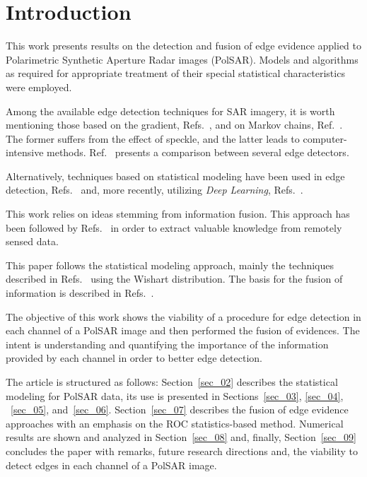 \documentclass[conference]{IEEEtran}
\begin{document}
\section{Introduction}\label{sec_01}

This work presents results on the detection and fusion of edge evidence applied to Polarimetric Synthetic Aperture Radar images (PolSAR). Models and algorithms as required for appropriate treatment of their special statistical characteristics were employed.

Among the available edge detection techniques for SAR imagery, it is worth mentioning those based on the gradient, Refs.~\cite{tlb, obw, flmc, fyf}, and on Markov chains, Ref.~\cite{bf}. The former suffers from the effect of speckle, and the latter leads to computer-intensive methods. Ref.~\cite{gfn} presents a comparison between several edge detectors. 

Alternatively, techniques based on statistical modeling have been used in edge detection, Refs.~\cite{gmbf, fbgm, horrit, gfn} and, more recently,  utilizing \textit{Deep Learning}, Refs.~\cite{bac, ztmxzxf, tabmm, xstz}.

This work relies on ideas stemming from information fusion.
This approach has been followed by Refs.~\cite{sglmla,sg} in order to extract valuable knowledge from remotely sensed data.

This paper follows the statistical modeling approach, mainly the techniques described in Refs.~\cite{fbgm, nhfc} using the Wishart distribution.
The basis for the fusion of information is described in Refs.~\cite{mit, sg}. 


The objective of this work shows the viability of a procedure for edge detection in each channel of a PolSAR image and then performed the fusion of evidences. The intent is understanding and quantifying the importance of the information provided by each channel in order to better edge detection.

The article is structured as follows: 
Section~\ref{sec_02} describes the statistical modeling for PolSAR data, 
its use is presented in Sections~\ref{sec_03}, \ref{sec_04}, ~\ref{sec_05}, and~\ref{sec_06}.
Section~\ref{sec_07} describes the fusion of edge evidence approaches with an emphasis on the ROC statistics-based method.
Numerical results are shown and analyzed in Section~\ref{sec_08} and, finally, Section~\ref{sec_09} concludes the paper with remarks, future research directions and, the viability to detect edges in each channel of a PolSAR image.
\end{document}

